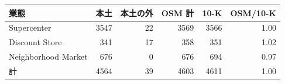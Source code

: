 \begin{tabular}{lrrrrr}
\toprule
業態 & 本土 & 本土の外 & OSM 計 & 10-K & OSM/10-K \\
\midrule
Supercenter & 3547 & 22 & 3569 & 3566 & 1.00 \\
Discount Store & 341 & 17 & 358 & 351 & 1.02 \\
Neighborhood Market & 676 & 0 & 676 & 694 & 0.97 \\
\midrule
計 & 4564 & 39 & 4603 & 4611 & 1.00 \\
\bottomrule
\end{tabular}
